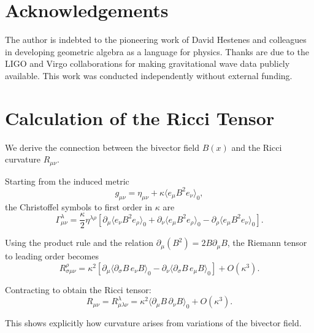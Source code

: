 \documentclass[11pt,a4paper]{article}
\numberwithin{equation}{section}
\theoremstyle{plain}
\theoremstyle{definition}
\theoremstyle{remark}
\begin{document}
\section*{Acknowledgements}
The author is indebted to the pioneering work of David Hestenes and colleagues in developing geometric algebra as a language for physics. Thanks are due to the LIGO and Virgo collaborations for making gravitational wave data publicly available. This work was conducted independently without external funding.
\fi

\appendix
\section{Calculation of the Ricci Tensor}
\label{app:ricci}

We derive the connection between the bivector field $B(x)$ and the Ricci curvature $R_{\mu\nu}$.

Starting from the induced metric
\begin{equation}
g_{\mu\nu} = \eta_{\mu\nu} + \kappa \langle e_\mu B^2 e_\nu \rangle_0,
\end{equation}
the Christoffel symbols to first order in $\kappa$ are
\begin{equation}
\Gamma^\lambda_{\mu\nu} = \frac{\kappa}{2} \eta^{\lambda\rho} \left[\partial_\mu \langle e_\nu B^2 e_\rho \rangle_0 + \partial_\nu \langle e_\mu B^2 e_\rho \rangle_0 - \partial_\rho \langle e_\mu B^2 e_\nu \rangle_0\right].
\end{equation}

Using the product rule and the relation $\partial_\mu (B^2) = 2 B \partial_\mu B$, the Riemann tensor to leading order becomes
\begin{equation}
R^\rho_{\sigma\mu\nu} = \kappa^2 \left[\partial_\mu \langle \partial_\sigma B \, e_\nu B \rangle_0 - \partial_\nu \langle \partial_\sigma B \, e_\mu B \rangle_0\right] + O(\kappa^3).
\end{equation}

Contracting to obtain the Ricci tensor:
\begin{equation}
R_{\mu\nu} = R^\lambda_{\mu\lambda\nu} = \kappa^2 \langle \partial_\mu B \, \partial_\nu B \rangle_0 + O(\kappa^3).
\end{equation}

This shows explicitly how curvature arises from variations of the bivector field.

\end{document}
